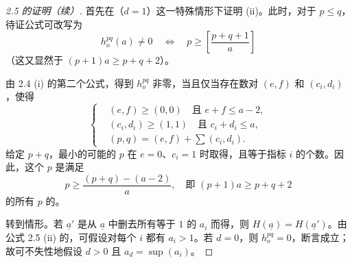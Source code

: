\begin{proof}[ 2.5 的证明（续）]
首先在（$d=1$）这一特殊情形下证明 (ii)。此时，对于 $p\leq q$，待证公式可改写为
\[
 h_o^{pq}(a)\ne0\quad\Longleftrightarrow\quad p\geq\left[\frac{p+q+1}{a}\right]\tag{2.5.2}
\]
（这又显然于 $(p+1)a\geq p+q+2$）。

由 2.4 (i) 的第二个公式，得到 $h_o^{pq}$ 非零，当且仅当存在数对 $(e,f)$ 和 $(c_i,d_i)$，使得
\[
\left\{\begin{aligned}
{}&(e,f)\geq(0,0)\quad\text{且 }e+f\leq a-2,\\
&(c_i,d_i)\geq(1,1)\quad\text{且 }c_i+d_i\leq a,\\
&(p,q)=(e,f)+\sum(c_i,d_i).
\end{aligned}\right.\tag{2.5.3}
\]
给定 $p+q$，最小的可能的 $p$ 在 $e=0$、$c_i=1$ 时取得，且等于指标 $i$ 的个数。因此，这个 $p$ 是满足
\[
 p\geq\frac{(p+q)-(a-2)}a,\quad\text{即 }(p+1)a\geq p+q+2
\]
的所有 $p$ 的。

转到情形。若 $\underline a'$ 是从 $\underline a$ 中删去所有等于 $1$ 的 $a_i$ 而得，则 $H(\underline a)=H(\underline a')$。由公式 2.5 (ii) 的，可假设对每个 $i$ 都有 $a_i>1$。若 $d=0$，则 $h_o^{pq}=0$，断言成立；故可不失性地假设 $d>0$ 且 $a_d=\sup(a_i)$。


\end{proof}
